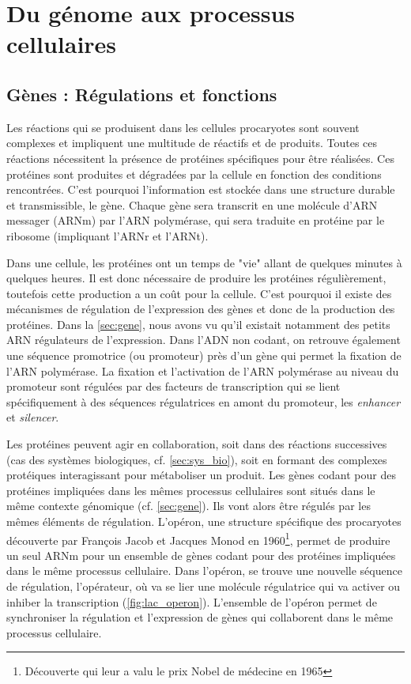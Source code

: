 \newpage
\section{Du génome aux processus cellulaires}

\subsection{Gènes : Régulations et fonctions}
\label{sec:fn_reg}

Les réactions qui se produisent dans les cellules procaryotes sont souvent complexes et impliquent une multitude de réactifs et de produits. Toutes ces réactions nécessitent la présence de protéines spécifiques pour être réalisées. Ces protéines sont produites et dégradées par la cellule en fonction des conditions rencontrées. C'est pourquoi l'information est stockée dans une structure durable et transmissible, le gène. Chaque gène sera transcrit en une molécule d'ARN messager (ARNm) par l'ARN polymérase, qui sera traduite en protéine par le ribosome (impliquant l'ARNr et l'ARNt). 


Dans une cellule, les protéines ont un temps de "vie" allant de quelques minutes à quelques heures. Il est donc nécessaire de produire les protéines régulièrement, toutefois cette production a un coût pour la cellule. C'est pourquoi il existe des mécanismes de régulation de l'expression des gènes et donc de la production des protéines. Dans la \autoref{sec:gene}, nous avons vu qu'il existait notamment des petits ARN régulateurs de l'expression. Dans l'ADN non codant, on retrouve également une séquence promotrice (ou promoteur) près d'un gène qui permet la fixation de l'ARN polymérase. La fixation et l'activation de l'ARN polymérase au niveau du promoteur sont régulées par des facteurs de transcription qui se lient spécifiquement à des séquences régulatrices en amont du promoteur, les \textit{enhancer} et \textit{silencer}.


Les protéines peuvent agir en collaboration, soit dans des réactions successives (cas des systèmes biologiques, cf. \autoref{sec:sys_bio}), soit en formant des complexes protéiques interagissant pour métaboliser un produit. Les gènes codant pour des protéines impliquées dans les mêmes processus cellulaires sont situés dans le même contexte génomique (cf. \autoref{sec:gene}). Ils vont alors être régulés par les mêmes éléments de régulation. L'opéron, une structure spécifique des procaryotes découverte par François Jacob et Jacques Monod en 1960\footnote{Découverte qui leur a valu le prix Nobel de médecine en 1965}\cite{jacob_genetic_1961}, permet de produire un seul ARNm pour un ensemble de gènes codant pour des protéines impliquées dans le même processus cellulaire. Dans l'opéron, se trouve une nouvelle séquence de régulation, l'opérateur, où va se lier une molécule régulatrice qui va activer ou inhiber la transcription (\autoref{fig:lac_operon}). L'ensemble de l'opéron permet de synchroniser la régulation et l'expression de gènes qui collaborent dans le même processus cellulaire.


